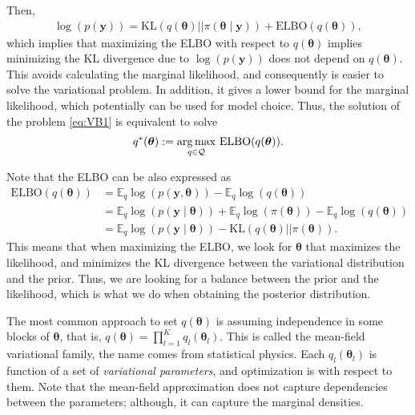 Then,
\begin{align*}
	\log(p(\boldsymbol{y})) = \text{KL}(q(\boldsymbol{\theta})||\pi(\boldsymbol{\theta} \mid \mathbf{y})) + \text{ELBO}(q(\boldsymbol{\theta})),  
\end{align*} 
which implies that maximizing the ELBO with respect to $q(\boldsymbol{\theta})$ implies minimizing the KL divergence due to $\log(p(\boldsymbol{y}))$ does not depend on $q(\boldsymbol{\theta})$. This avoids calculating the marginal likelihood, and consequently is easier to solve the variational problem. In addition, it gives a lower bound for the marginal likelihood, which potentially can be used for model choice. Thus, the solution of the problem \ref{eq:VB1} is equivalent to solve
\begin{align}\label{eq:VB2}
	q^*(\boldsymbol{\theta}):=\underset{q \in \mathcal{Q}}{\argmax} \  \text{ELBO}(q(\boldsymbol{\theta})).
\end{align}

Note that the ELBO can be also expressed as 
\begin{align*}
	\text{ELBO}(q(\boldsymbol{\theta}))&=\mathbb{E}_q\log(p(\boldsymbol{y}, \boldsymbol{\theta}))-\mathbb{E}_q\log(q(\boldsymbol{\theta}))\\
	&=\mathbb{E}_q\log(p(\boldsymbol{y}\mid \boldsymbol{\theta}))+\mathbb{E}_q\log(\pi(\boldsymbol{\theta}))-\mathbb{E}_q\log(q(\boldsymbol{\theta}))\\
	&=\mathbb{E}_q\log(p(\boldsymbol{y}\mid \boldsymbol{\theta}))-\text{KL}(q(\boldsymbol{\theta})||\pi(\boldsymbol{\theta})).
\end{align*} 
This means that when maximizing the ELBO, we look for $\boldsymbol{\theta}$ that maximizes the likelihood, and minimizes the KL divergence between the variational distribution and the prior. Thus, we are looking for a balance between the prior and the likelihood, which is what we do when obtaining the posterior distribution.

The most common approach to set $q(\boldsymbol{\theta})$ is assuming independence in some blocks of $\boldsymbol{\theta}$, that is, $q(\boldsymbol{\theta})=\prod_{l=1}^K q_l(\boldsymbol{\theta}_l)$. This is called the mean-field variational family, the name comes from statistical physics. Each $q_l(\boldsymbol{\theta}_l)$ is function of a set of \textit{variational parameters}, and optimization is with respect to them. Note that the mean-field approximation does not capture dependencies between the parameters; although, it can capture the marginal densities.

